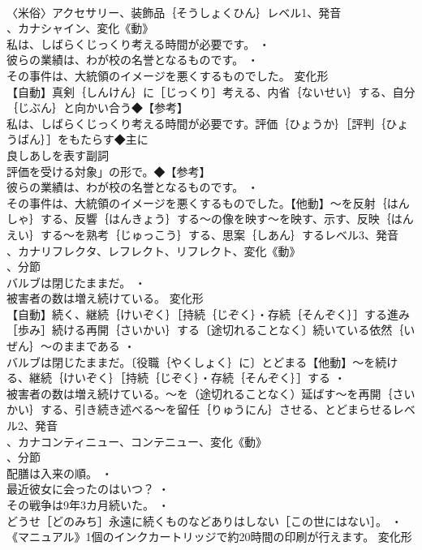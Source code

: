 \documentclass[8pt]{extreport}
\begin{document}
\begin{CJK}{UTF8}{min}
\\	〈米俗〉アクセサリー、装飾品｛そうしょくひん｝レベル1、発音
\\	、カナシャイン、変化《動》
\\	私は、しばらくじっくり考える時間が必要です。 ・
\\	彼らの業績は、わが校の名誉となるものです。 ・
\\	その事件は、大統領のイメージを悪くするものでした。	変化形 
\\	【自動】真剣｛しんけん｝に［じっくり］考える、内省｛ないせい｝する、自分｛じぶん｝と向かい合う◆【参考】
\\	私は、しばらくじっくり考える時間が必要です。評価｛ひょうか｝［評判｛ひょうばん｝］をもたらす◆主に
\\	良しあしを表す副詞 
\\	評価を受ける対象」の形で。◆【参考】
\\	彼らの業績は、わが校の名誉となるものです。 ・
\\	その事件は、大統領のイメージを悪くするものでした。【他動】～を反射｛はんしゃ｝する、反響｛はんきょう｝する～の像を映す～を映す、示す、反映｛はんえい｝する～を熟考｛じゅっこう｝する、思案｛しあん｝するレベル3、発音
\\	、カナリフレクタ、レフレクト、リフレクト、変化《動》
\\	、分節
\\	バルブは閉じたままだ。 ・
\\	被害者の数は増え続けている。	変化形 
\\	【自動】続く、継続｛けいぞく｝［持続｛じぞく｝・存続｛そんぞく｝］する進み［歩み］続ける再開｛さいかい｝する〔途切れることなく〕続いている依然｛いぜん｝～のままである ・
\\	バルブは閉じたままだ。〔役職｛やくしょく｝に〕とどまる【他動】～を続ける、継続｛けいぞく｝［持続｛じぞく｝・存続｛そんぞく｝］する ・
\\	被害者の数は増え続けている。～を（途切れることなく）延ばす～を再開｛さいかい｝する、引き続き述べる～を留任｛りゅうにん｝させる、とどまらせるレベル2、発音
\\	、カナコンティニュー、コンテニュー、変化《動》
\\	、分節
\\	配膳は入来の順。 ・
\\	最近彼女に会ったのはいつ？ ・
\\	その戦争は9年3カ月続いた。 ・
\\	どうせ［どのみち］永遠に続くものなどありはしない［この世にはない］。 ・
\\	《マニュアル》1個のインクカートリッジで約20時間の印刷が行えます。	変化形 

\end{CJK}
\end{document}
